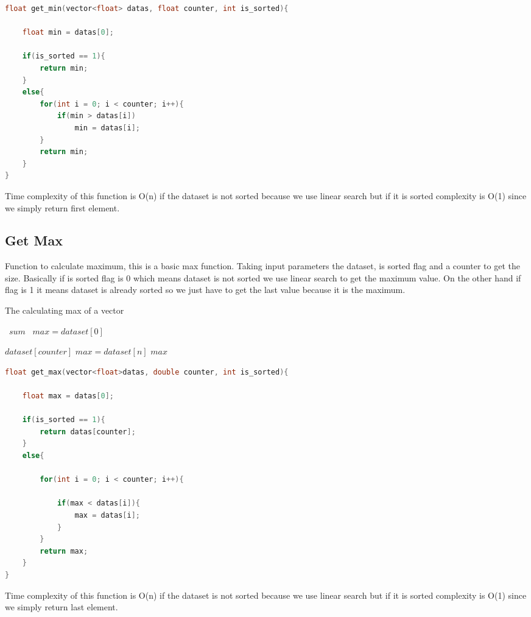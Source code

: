 \documentclass[a4paper, 12pt, titlepage]{article}
\begin{document}
\usepackage{\textbf{Code for Get Min}}
\begin{lstlisting}[language=C++]
float get_min(vector<float> datas, float counter, int is_sorted){           
        
    float min = datas[0];

    if(is_sorted == 1){                        
        return min;
    }
    else{
        for(int i = 0; i < counter; i++){
            if(min > datas[i])
                min = datas[i];
        }
        return min;
    }    
}
\end{lstlisting}
Time complexity of this function is O(n) if the dataset is not sorted because we use linear search but if it is sorted complexity is O(1) since we simply return first element.
\newpage

\subsection{Get Max}

    Function to calculate maximum, this is a basic max function. Taking input parameters the dataset, is sorted flag and a counter to get the size. Basically if is sorted flag is 0 which means dataset is not sorted we use linear search to get the maximum value. On the other hand if flag is 1 it means dataset is already sorted so we just have to get the last value because it is the maximum.

\begin{algorithm}[H]
	\caption{The calculating max of a vector}
	\label{algo:dfs}
	\begin{algorithmic}

		
            \State\ $sum$
            \State\ $max = dataset[0]$ 

                \State \Return $ dataset[counter] $
            \EndIf
                    \State $ max = dataset[n] $
                \EndIf
            \EndFor
		\State \Return $ max $
	\EndFunction
	\end{algorithmic}
\end{algorithm}

    
\usepackage{\textbf{Codeode for Get Max}}
\begin{lstlisting}[language=C++]
float get_max(vector<float>datas, double counter, int is_sorted){       
    
    float max = datas[0];

    if(is_sorted == 1){                     
        return datas[counter];
    }
    else{
        
        for(int i = 0; i < counter; i++){
            
            if(max < datas[i]){
                max = datas[i];
            }
        }
        return max;
    }
}
\end{lstlisting}
Time complexity of this function is O(n) if the dataset is not sorted because we use linear search but if it is sorted complexity is O(1) since we simply return last element.
\end{document}
